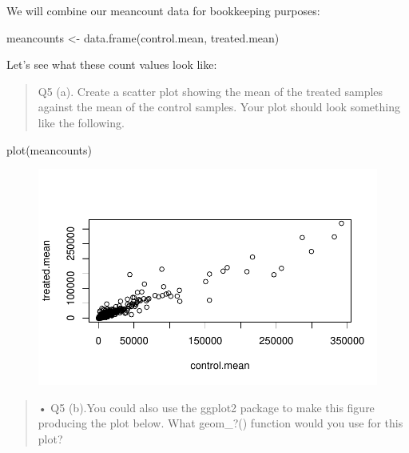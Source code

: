 \documentclass[
  letterpaper,
  DIV=11,
  numbers=noendperiod]{scrartcl}
\newenvironment{Shaded}{\begin{snugshade}}{\end{snugshade}}
\newcommand{\FunctionTok}[1]{\textcolor[rgb]{0.28,0.35,0.67}{#1}}
\newcommand{\NormalTok}[1]{\textcolor[rgb]{0.00,0.23,0.31}{#1}}
\newcommand{\OtherTok}[1]{\textcolor[rgb]{0.00,0.23,0.31}{#1}}
\begin{document}
We will combine our meancount data for bookkeeping purposes:

\begin{Shaded}
\begin{Highlighting}[]
\NormalTok{meancounts }\OtherTok{\textless{}{-}} \FunctionTok{data.frame}\NormalTok{(control.mean, treated.mean)}
\end{Highlighting}
\end{Shaded}

Let's see what these count values look like:

\begin{quote}
Q5 (a). Create a scatter plot showing the mean of the treated samples
against the mean of the control samples. Your plot should look something
like the following.
\end{quote}

\begin{Shaded}
\begin{Highlighting}[]
\FunctionTok{plot}\NormalTok{(meancounts)}
\end{Highlighting}
\end{Shaded}

\begin{figure}[H]

{\centering \includegraphics{Class13_files/figure-pdf/unnamed-chunk-13-1.pdf}

}

\end{figure}

\begin{quote}
• Q5 (b).You could also use the ggplot2 package to make this figure
producing the plot below. What geom\_?() function would you use for this
plot?
\end{quote}
\end{document}
